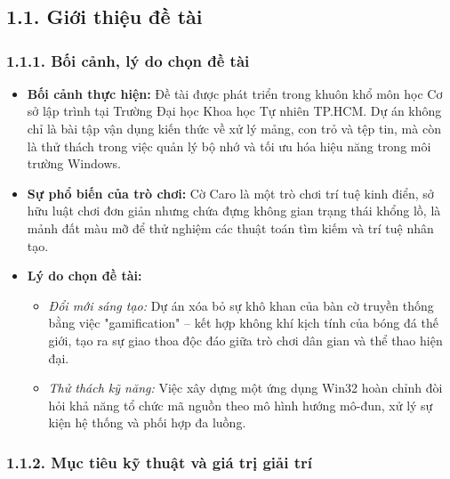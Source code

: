 \newpage
\chapter*{}

\section*{1.1. Giới thiệu đề tài}

\subsection*{1.1.1. Bối cảnh, lý do chọn đề tài}

\begin{itemize}
    \item \textbf{Bối cảnh thực hiện:} Đề tài được phát triển trong khuôn khổ môn học Cơ sở lập trình tại Trường Đại học Khoa học Tự nhiên TP.HCM. Dự án không chỉ là bài tập vận dụng kiến thức về xử lý mảng, con trỏ và tệp tin, mà còn là thử thách trong việc quản lý bộ nhớ và tối ưu hóa hiệu năng trong môi trường Windows.
    \item \textbf{Sự phổ biến của trò chơi:} Cờ Caro là một trò chơi trí tuệ kinh điển, sở hữu luật chơi đơn giản nhưng chứa đựng không gian trạng thái khổng lồ, là mảnh đất màu mỡ để thử nghiệm các thuật toán tìm kiếm và trí tuệ nhân tạo.
    \item \textbf{Lý do chọn đề tài:} 
    \begin{itemize}
        \item \textit{Đổi mới sáng tạo:} Dự án xóa bỏ sự khô khan của bàn cờ truyền thống bằng việc "gamification" – kết hợp không khí kịch tính của bóng đá thế giới, tạo ra sự giao thoa độc đáo giữa trò chơi dân gian và thể thao hiện đại.
        \item \textit{Thử thách kỹ năng:} Việc xây dựng một ứng dụng Win32 hoàn chỉnh đòi hỏi khả năng tổ chức mã nguồn theo mô hình hướng mô-đun, xử lý sự kiện hệ thống và phối hợp đa luồng.
    \end{itemize}
\end{itemize}

\subsection*{1.1.2. Mục tiêu kỹ thuật và giá trị giải trí}


